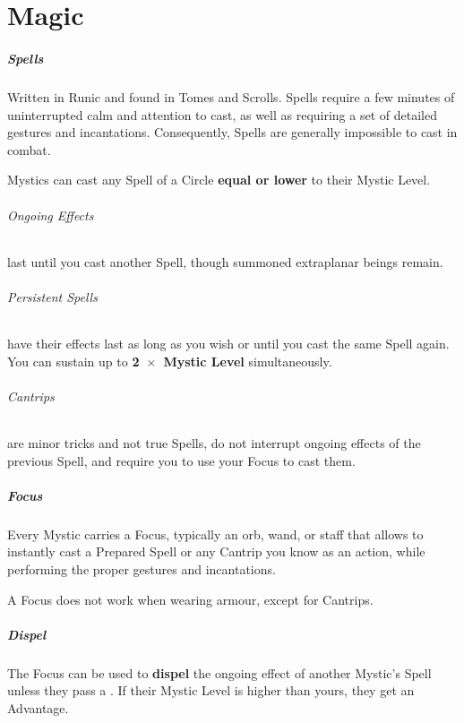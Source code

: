 \documentclass[itdr]{subfiles}
\begin{document}
\chapter{Magic}
\label{ch:magic}

\paragraph{Spells}
Written in Runic and found in Tomes and Scrolls. Spells require a few minutes of uninterrupted calm and attention to cast, as well as requiring a set of detailed gestures and incantations. Consequently, Spells are generally impossible to cast in combat.

Mystics can cast any Spell of a Circle \textbf{equal or lower} to their Mystic Level.

\subparagraph{Ongoing Effects} last until you cast another Spell, though summoned extraplanar beings remain.

\subparagraph{Persistent Spells} have their effects last as long as you wish or until you cast the same Spell again. You can sustain up to \textbf{2~$\times$~Mystic Level} simultaneously.

\subparagraph{Cantrips} are minor tricks and not true Spells, do not interrupt ongoing effects of the previous Spell, and require you to use your Focus to cast them.

\vfill
{}
\paragraph{Focus}
Every Mystic carries a Focus, typically an orb, wand, or staff that allows to instantly cast a Prepared Spell or any Cantrip you know as an action, while performing the proper gestures and incantations.

A Focus does not work when wearing armour, \mbox{except} for Cantrips.

\vfill
{}
\paragraph{Dispel}
The Focus can be used to \textbf{dispel} the ongoing effect of another Mystic's Spell unless they pass a . If their Mystic Level is higher than yours, they get an Advantage.
\end{document}
